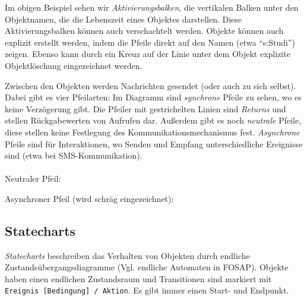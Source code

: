 \documentclass{panikzettel}
\begin{document}

Im obigen Beispiel sehen wir \emph{Aktivierungsbalken}, die vertikalen Balken unter den Objektnamen, die die Lebenszeit eines Objektes darstellen. Diese Aktivierungsbalken können auch verschachtelt werden. Objekte können auch explizit erstellt werden, indem die Pfeile direkt auf den Namen (etwa ``s:Studi'') zeigen. Ebenso kann durch ein Kreuz auf der Linie unter dem Objekt explizite Objektlöschung eingezeichnet werden.

Zwischen den Objekten werden Nachrichten gesendet (oder auch zu sich selbst). Dabei gibt es vier Pfeilarten: Im Diagramm sind \emph{synchrone} Pfeile zu sehen, wo es keine Verzögerung gibt. Die Pfeiler mit gestrichelten Linien sind \emph{Returns} und stellen Rückgabewerten von Aufrufen dar. Außerdem gibt es noch \emph{neutrale} Pfeile, diese stellen keine Festlegung des Kommunikationsmechanismus fest. \emph{Asynchrone} Pfeile sind für Interaktionen, wo Senden und Empfang unterschiedliche Ereignisse sind (etwa bei SMS-Kommunikation).
~\\~\\
Neutraler Pfeil: 

Asynchroner Pfeil (wird schräg eingezeichnet): 

\subsection{Statecharts}
\label{sec:statecharts}

\emph{Statecharts} beschreiben das Verhalten von Objekten durch endliche  Zustandsübergangsdiagramme (Vgl. endliche Automaten in FOSAP). Objekte haben einen endlichen Zustandsraum und Transitionen sind markiert mit \lstinline{Ereignis [Bedingung] / Aktion}. Es gibt immer einen Start- und Endpunkt.
\end{document}
